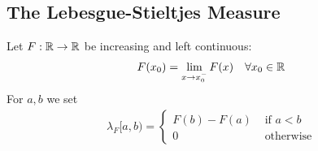 \subsection{The Lebesgue-Stieltjes Measure}
Let $F: \mathbb{R} \to \mathbb{R}$ be increasing and left continuous:
\begin{align*}
  F(x_0) = \lim_{x \to x_0^{-}}F(x) \quad \forall x_0 \in \mathbb{R}
\end{align*}
For $a,b$ we set
\begin{align*}
  \lambda_F[a,b) = \left\{\begin{array}{ll}
      F(b) - F(a) & \text{ if }a < b\\
    0 & \text{ otherwise}
  \end{array} \right.
\end{align*}


